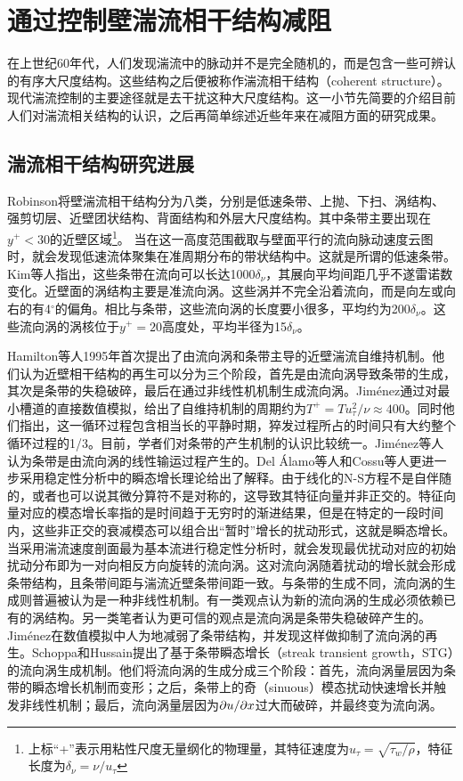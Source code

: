 \section{通过控制壁湍流相干结构减阻}
在上世纪60年代，人们发现湍流中的脉动并不是完全随机的，而是包含一些可辨认的有序大尺度结构。这些结构之后便被称作湍流相干结构（coherent structure）。现代湍流控制的主要途径就是去干扰这种大尺度结构。这一小节先简要的介绍目前人们对湍流相关结构的认识，之后再简单综述近些年来在减阻方面的研究成果。
\subsection{湍流相干结构研究进展}
Robinson\cite{Robinson1991}将壁湍流相干结构分为八类，分别是低速条带、上抛、下扫、涡结构、强剪切层、近壁团状结构、背面结构和外层大尺度结构。其中条带主要出现在$y^+<30$的近壁区域\footnote{上标“+”表示用粘性尺度无量纲化的物理量，其特征速度为$u_\tau=\sqrt{\tau_w/\rho}$，特征长度为$\delta_\nu=\nu/u_\tau$}。
当在这一高度范围截取与壁面平行的流向脉动速度云图时，就会发现低速流体聚集在准周期分布的带状结构中。这就是所谓的低速条带。Kim等人\cite{Kim1987}指出，这些条带在流向可以长达1000$\delta_\nu$，其展向平均间距几乎不遂雷诺数变化。近壁面的涡结构主要是准流向涡。这些涡并不完全沿着流向，而是向左或向右的有4$^\circ$的偏角\cite{Jeong1997}。相比与条带，这些流向涡的长度要小很多，平均约为200$\delta_\nu$。这些流向涡的涡核位于$y^+=20$高度处，平均半径为15$\delta_\nu$。

Hamilton等人\cite{Hamilton1995}1995年首次提出了由流向涡和条带主导的近壁湍流自维持机制。他们认为近壁相干结构的再生可以分为三个阶段，首先是由流向涡导致条带的生成，其次是条带的失稳破碎，最后在通过非线性机机制生成流向涡。Jim\'enez\cite{Jimenez2005}通过对最小槽道的直接数值模拟，给出了自维持机制的周期约为$T^+=Tu^2_\tau/\nu\approx400$。同时他们指出，这一循环过程包含相当长的平静时期，猝发过程所占的时间只有大约整个循环过程的1/3。目前，学者们对条带的产生机制的认识比较统一。Jim\'enez等人\cite{Jimenez1999}认为条带是由流向涡的线性输运过程产生的。Del \'Alamo等人\cite{del2006}和Cossu等人\cite{Cossu2009}更进一步采用稳定性分析中的瞬态增长理论给出了解释。由于线化的N-S方程不是自伴随的，或者也可以说其微分算符不是对称的，这导致其特征向量并非正交的。特征向量对应的模态增长率指的是时间趋于无穷时的渐进结果，但是在特定的一段时间内，这些非正交的衰减模态可以组合出“暂时”增长的扰动形式，这就是瞬态增长。当采用湍流速度剖面最为基本流进行稳定性分析时，就会发现最优扰动对应的初始扰动分布即为一对向相反方向旋转的流向涡。这对流向涡随着扰动的增长就会形成条带结构，且条带间距与湍流近壁条带间距一致。与条带的生成不同，流向涡的生成则普遍被认为是一种非线性机制。有一类观点认为新的流向涡的生成必须依赖已有的涡结构\cite{Heist2000}。另一类笔者认为更可信的观点是流向涡是条带失稳破碎产生的。Jim\'enez\cite{Jimenez1999}在数值模拟中人为地减弱了条带结构，并发现这样做抑制了流向涡的再生。Schoppa和Hussain\cite{Schoppa2002}提出了基于条带瞬态增长（streak
transient growth，STG）的流向涡生成机制。他们将流向涡的生成分成三个阶段：首先，流向涡量层因为条带的瞬态增长机制而变形；之后，条带上的奇（sinuous）模态扰动快速增长并触发非线性机制；最后，流向涡量层因为$\partial u/\partial x$过大而破碎，并最终变为流向涡。


